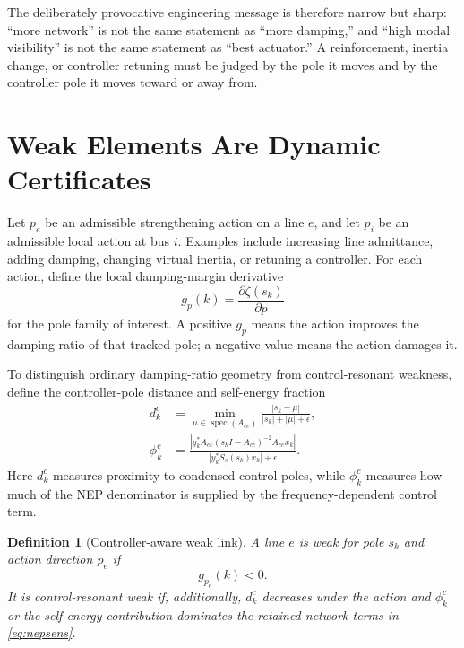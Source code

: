 \documentclass[conference]{IEEEtran}
\newtheorem{definition}{Definition}
\newcommand{\spec}{\operatorname{spec}}
\begin{document}
The deliberately provocative engineering message is therefore narrow but sharp:
``more network'' is not the same statement as ``more damping,'' and ``high modal
visibility'' is not the same statement as ``best actuator.'' A reinforcement,
inertia change, or controller retuning must be judged by the pole it moves and
by the controller pole it moves toward or away from.

\section{Weak Elements Are Dynamic Certificates}

Let $p_e$ be an admissible strengthening action on a line $e$, and let $p_i$ be an admissible local action at bus $i$. Examples include increasing line admittance, adding damping, changing virtual inertia, or retuning a controller. For each action, define the local damping-margin derivative
\begin{equation}
  g_p(k)=\frac{\partial\zeta(s_k)}{\partial p}
  \label{eq:gp}
\end{equation}
for the pole family of interest. A positive $g_p$ means the action improves the damping ratio of that tracked pole; a negative value means the action damages it.

To distinguish ordinary damping-ratio geometry from control-resonant weakness, define the controller-pole distance and self-energy fraction
\begin{align}
  d_k^{c} &= \min_{\mu\in\spec(A_{cc})}
  \frac{|s_k-\mu|}{|s_k|+|\mu|+\epsilon},
  \label{eq:dist}\\
  \phi_k^{c} &=
  \frac{\left|y_k^\ast A_{ec}(s_kI-A_{cc})^{-2}A_{ce}x_k\right|}
  {\left|y_k^\ast S_s(s_k)x_k\right|+\epsilon}.
  \label{eq:phi}
\end{align}
Here $d_k^c$ measures proximity to condensed-control poles, while $\phi_k^c$ measures how much of the NEP denominator is supplied by the frequency-dependent control term.

\begin{definition}[Controller-aware weak link]
A line $e$ is weak for pole $s_k$ and action direction $p_e$ if
\begin{equation}
  g_{p_e}(k)<0 .
  \label{eq:weaklink}
\end{equation}
It is control-resonant weak if, additionally, $d_k^c$ decreases under the action and $\phi_k^c$ or the self-energy contribution dominates the retained-network terms in \eqref{eq:nepsens}.
\end{definition}
\end{document}
